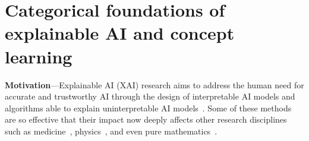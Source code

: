 \chapter{Categorical foundations of explainable AI and concept learning} \label{chapter:background}


\textbf{Motivation}---Explainable AI (XAI) research aims to address the human need for accurate and trustworthy AI through the design of interpretable AI models and algorithms able to explain uninterpretable AI models~\cite{arrieta2020explainable}. 
Some of these methods are so effective that their impact now deeply affects other research disciplines such as medicine~\cite{jimenez2020drug}, physics~\cite{schmidt2009distilling,cranmer2019learning}, and even pure mathematics~\cite{davies2021advancing}. 

